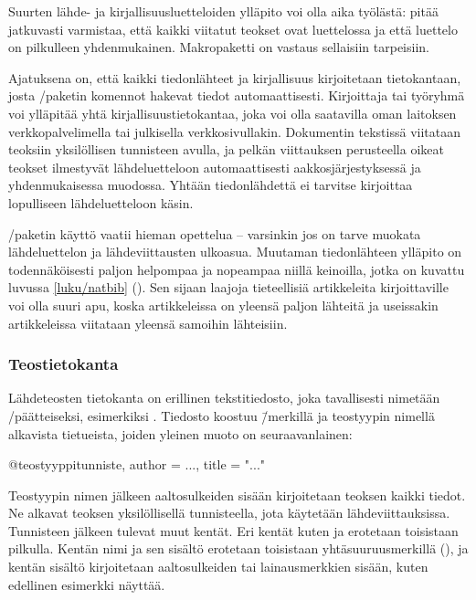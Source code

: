 Suurten lähde- ja kirjallisuusluetteloiden ylläpito voi olla aika
työlästä: pitää jatkuvasti varmistaa, että kaikki viitatut teokset ovat
luettelossa ja että luettelo on pilkulleen yhdenmukainen. Makropaketti
 on vastaus sellaisiin tarpeisiin.

Ajatuksena on, että kaikki tiedonlähteet ja kirjallisuus kirjoitetaan
tietokantaan, josta \-/paketin komennot hakevat tiedot
automaattisesti. Kirjoittaja tai työryhmä voi ylläpitää yhtä
kirjallisuustietokantaa, joka voi olla saatavilla oman laitoksen
verkkopalvelimella tai julkisella verkkosivullakin. Dokumentin tekstissä
viitataan teoksiin yksilöllisen tunnisteen avulla, ja pelkän viittauksen
perusteella oikeat teokset ilmestyvät lähdeluetteloon automaattisesti
aakkosjärjestyksessä ja yhdenmukaisessa muodossa. Yhtään tiedonlähdettä
ei tarvitse kirjoittaa lopulliseen lähdeluetteloon käsin.

\-/paketin käyttö vaatii hieman opettelua -- varsinkin
jos on tarve muokata lähdeluettelon ja lähdeviittausten ulkoasua.
Muutaman tiedonlähteen ylläpito on todennäköisesti paljon helpompaa ja
nopeampaa niillä keinoilla, jotka on kuvattu luvussa \ref{luku/natbib}
(). Sen sijaan laajoja tieteellisiä artikkeleita
kirjoittaville  voi olla suuri apu, koska
artikkeleissa on yleensä paljon lähteitä ja useissakin artikkeleissa
viitataan yleensä samoihin lähteisiin.

\subsubsection{Teostietokanta}

Lähdeteosten tietokanta on erillinen tekstitiedosto, joka tavallisesti
nimetään \-/päätteiseksi, esimerkiksi .
Tiedosto koostuu \=/merkillä ja teostyypin nimellä alkavista
tietueista, joiden yleinen muoto on seuraavanlainen:

\begin{koodilohkosis}
@teostyyppi{tunniste,
  author = {...},
  title = "..."
}
\end{koodilohkosis}

Teostyypin nimen jälkeen aaltosulkeiden sisään kirjoitetaan teoksen
kaikki tiedot. Ne alkavat teoksen yksilöllisellä tunnisteella, jota
käytetään lähdeviittauksissa. Tunnisteen jälkeen tulevat muut kentät.
Eri kentät kuten  ja  erotetaan toisistaan
pilkulla. Kentän nimi ja sen sisältö erotetaan toisistaan
yhtäsuuruusmerkillä (\koodi{=}), ja kentän sisältö kirjoitetaan
aaltosulkeiden tai lainausmerkkien sisään, kuten edellinen esimerkki
näyttää.

